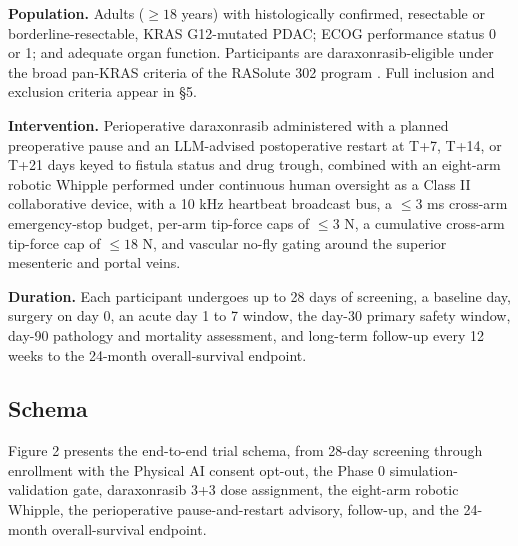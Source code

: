 \textbf{Population.} Adults ($\geq 18$ years) with histologically confirmed,
resectable or borderline-resectable, KRAS G12-mutated PDAC; ECOG performance
status 0 or 1; and adequate organ function. Participants are daraxonrasib-eligible
under the broad pan-KRAS criteria of the RASolute 302 program
\cite{rasolute302}. Full inclusion and exclusion criteria appear in \S5.

\textbf{Intervention.} Perioperative daraxonrasib administered with a planned
preoperative pause and an LLM-advised postoperative restart at T+7, T+14, or T+21
days keyed to fistula status and drug trough, combined with an eight-arm robotic
Whipple performed under continuous human oversight as a Class II collaborative
device, with a 10 kHz heartbeat broadcast bus, a $\leq 3$ ms cross-arm
emergency-stop budget, per-arm tip-force caps of $\leq 3$ N, a cumulative
cross-arm tip-force cap of $\leq 18$ N, and vascular no-fly gating around the
superior mesenteric and portal veins.

\textbf{Duration.} Each participant undergoes up to 28 days of screening, a
baseline day, surgery on day 0, an acute day 1 to 7 window, the day-30 primary
safety window, day-90 pathology and mortality assessment, and long-term
follow-up every 12 weeks to the 24-month overall-survival endpoint.

\subsection{Schema}

Figure 2 presents the end-to-end trial schema, from 28-day screening through
enrollment with the Physical AI consent opt-out, the Phase 0 simulation-validation
gate, daraxonrasib 3+3 dose assignment, the eight-arm robotic Whipple, the
perioperative pause-and-restart advisory, follow-up, and the 24-month
overall-survival endpoint.

